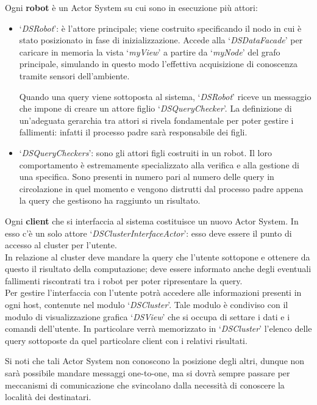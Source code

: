 Ogni \textbf{robot} è un Actor System su cui sono in esecuzione più attori:
\begin{itemize}
\item `\emph{DSRobot}': è l'attore principale; viene costruito specificando
  il nodo in cui è stato posizionato in fase di inizializzazione.
  Accede alla `\emph{DSDataFacade}' per caricare in memoria la vista
  `\emph{myView}' a partire da `\emph{myNode}'
  del grafo principale, simulando in questo modo l'effettiva
  acquisizione di conoscenza tramite sensori dell'ambiente.

  Quando una query viene sottoposta al sistema, `\emph{DSRobot}' riceve
  un messaggio che impone di creare un attore figlio
  `\emph{DSQueryChecker}'.
  La definizione di un'adeguata gerarchia tra attori si rivela fondamentale
  per poter gestire i fallimenti: infatti il processo padre sarà
  responsabile dei figli.
\item `\emph{DSQueryCheckers}': sono gli attori figli costruiti in un
  robot. Il loro comportamento è estremamente specializzato alla
  verifica e alla gestione di una specifica. Sono presenti in numero pari
  al numero delle query in circolazione in quel momento e vengono
  distrutti dal processo padre appena la query che gestisono ha raggiunto
  un risultato.
\end{itemize}

Ogni \textbf{client} che si interfaccia al sistema costituisce un nuovo Actor System.
In esso c'è un solo attore `\emph{DSClusterInterfaceActor}':
esso deve essere il punto di accesso al cluster per l'utente.\\
In relazione al cluster deve mandare la query che l'utente
sottopone e ottenere da questo il risultato della computazione;
deve essere informato anche degli eventuali fallimenti
riscontrati tra i robot per poter ripresentare la query.\\
Per gestire l'interfaccia con l'utente potrà accedere alle informazioni
presenti in ogni host, contenute nel modulo `\emph{DSCluster}'.
Tale modulo è condiviso con il modulo di visualizzazione grafica
`\emph{DSView}' che si occupa di settare i dati e i comandi dell'utente.
In particolare verrà memorizzato in `\emph{DSCluster}' l'elenco delle
query sottoposte da quel particolare client con i relativi
risultati.

Si noti che tali Actor System non conoscono la posizione degli altri,
dunque non sarà possibile mandare messaggi one-to-one,
ma si dovrà sempre passare per meccanismi di comunicazione che svincolano
dalla necessità di conoscere la località dei destinatari.

